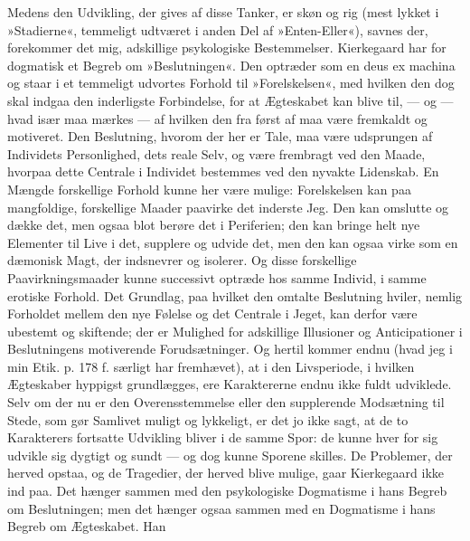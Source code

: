 \documentclass[12pt,a4paper,openany]{book}
\newcommand{\opage}[1]{\marginnote{\footnotesize\textit{[#1]}}}
\begin{document}
Medens den Udvikling, der gives af disse Tanker,
er skøn og rig (mest lykket i »Stadierne«, temmeligt udtværet
i anden Del af »Enten-Eller«), savnes der, forekommer
det mig, adskillige psykologiske Bestemmelser.
Kierkegaard har for dogmatisk et Begreb om »Beslutningen«.
Den optræder som en deus ex machina og staar
i et temmeligt udvortes Forhold til »Forelskelsen«, med
hvilken den dog skal indgaa den inderligste Forbindelse,
for at Ægteskabet kan blive til, --- og --- hvad især maa
mærkes --- af hvilken den fra først af maa være fremkaldt
og motiveret. Den Beslutning, hvorom der her er Tale,
maa være udsprungen af Individets Personlighed, dets
reale Selv, og være frembragt ved den Maade, hvorpaa
dette Centrale i Individet bestemmes ved den nyvakte
Lidenskab. En Mængde forskellige Forhold kunne her
være mulige: Forelskelsen kan paa mangfoldige, forskellige
Maader paavirke det inderste Jeg. Den kan omslutte
og dække det, men ogsaa blot berøre det i Periferien;
den kan bringe helt nye Elementer til Live i det, supplere
og udvide det, men den kan ogsaa virke som en
dæmonisk Magt, der indsnevrer og isolerer. Og disse
forskellige Paavirkningsmaader kunne successivt optræde
hos samme Individ, i samme erotiske Forhold. Det
Grundlag, paa hvilket den omtalte Beslutning hviler,
nemlig Forholdet mellem den nye Følelse og det Centrale
i Jeget, kan derfor være ubestemt og skiftende; der er
Mulighed for adskillige Illusioner og Anticipationer i
Beslutningens motiverende Forudsætninger. Og hertil
\opage{94}kommer endnu (hvad jeg i min Etik. p. 178 f. særligt
har fremhævet), at i den Livsperiode, i hvilken Ægteskaber
hyppigst grundlægges, ere Karaktererne endnu
ikke fuldt udviklede. Selv om der nu er den Overensstemmelse
eller den supplerende Modsætning til Stede,
som gør Samlivet muligt og lykkeligt, er det jo ikke
sagt, at de to Karakterers fortsatte Udvikling bliver i
de samme Spor: de kunne hver for sig udvikle sig dygtigt
og sundt --- og dog kunne Sporene skilles. De
Problemer, der herved opstaa, og de Tragedier, der herved
blive mulige, gaar Kierkegaard ikke ind paa. Det
hænger sammen med den psykologiske Dogmatisme i hans
Begreb om Beslutningen; men det hænger ogsaa sammen
med en Dogmatisme i hans Begreb om Ægteskabet. Han
\end{document}
